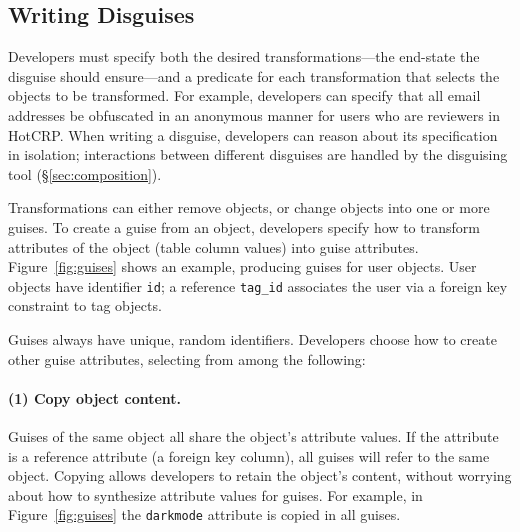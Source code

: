 %
%
%

\subsection{Writing Disguises}
\label{sec:disguises}
Developers must specify both the desired transformations---the end-state the disguise should
ensure---and a predicate for each transformation that selects the objects to be transformed.  For
example, developers can specify that all email addresses be obfuscated in an anonymous manner for
users who are reviewers in HotCRP.  When writing a disguise, developers can reason about its
specification in isolation; interactions between different disguises are handled by the disguising
tool (\S\ref{sec:composition}).

Transformations can either remove objects, or change objects into one or more guises.
To create a guise from an object, developers specify how to transform attributes of the
object (\eg table column values) into guise attributes.
%
Figure~\ref{fig:guises} shows an example, producing guises for user objects.
%
User objects have identifier \texttt{id}; a reference \texttt{tag\_id}
associates the user via a foreign key constraint to tag objects.
%

%
Guises always have unique, random identifiers.
%
Developers choose how to create other guise attributes, selecting from among the following:
%
\paragraph{(1) Copy object content.}
%
Guises of the same object all share the object's attribute values.
%
If the attribute is a reference attribute (\eg a foreign key column), all guises will refer to the same object.
%
%
Copying allows developers to retain the object's content, without worrying about how to
synthesize attribute values for guises.
%
For example, in Figure~\ref{fig:guises} the \texttt{darkmode} attribute is copied in
all guises.

